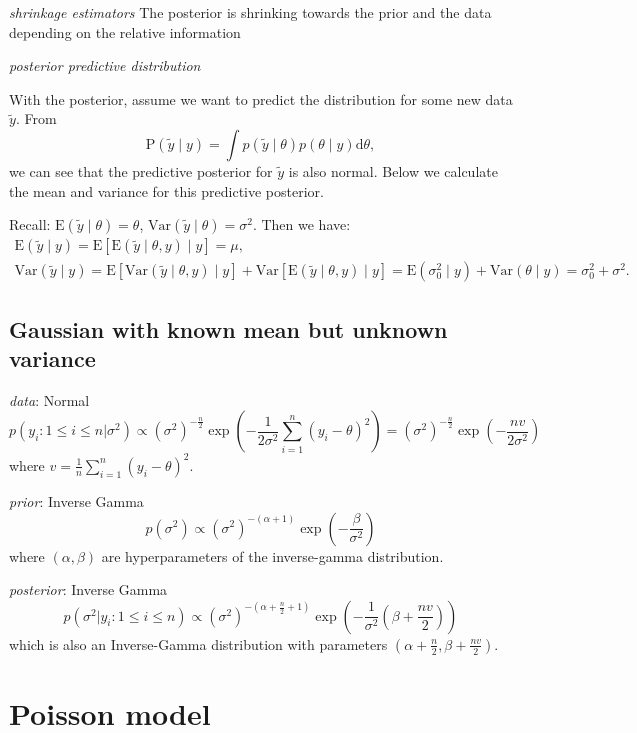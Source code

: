 \documentclass[twoside]{article}
\begin{document}
\textit{shrinkage estimators}
The posterior is shrinking towards the prior and the data depending on the relative information

\textit{posterior predictive distribution} 

With the posterior, assume we want to predict the distribution for some new data $\tilde{y}$. From
\[
\text{P}(\tilde{y}\mid y) = \int p(\tilde{y}\mid \theta) p(\theta\mid y)\mathrm{d}\theta,
\]
we can see that the predictive posterior for $\tilde{y}$ is also normal. Below we calculate the mean and variance for this predictive posterior.

Recall: $\mathrm{E}(\tilde{y}\mid \theta) = \theta$, $\mathrm{Var}(\tilde{y}\mid \theta) = \sigma^2$. Then we have:
\begin{gather*}
\mathrm{E}(\tilde{y}\mid y) = \mathrm{E}\left[\mathrm{E}(\tilde{y}\mid \theta,y)\mid y\right] = \mu,\\
\mathrm{Var}(\tilde{y}\mid y) = \mathrm{E}[\mathrm{Var}(\tilde{y}\mid \theta,y)\mid y] + \mathrm{Var}[\mathrm{E}(\tilde{y}\mid \theta,y)\mid y] = \mathrm{E}(\sigma_0^2 \mid y) + \mathrm{Var}(\theta\mid y ) = \sigma_0^2 + \sigma^2.
\end{gather*}

\subsection{Gaussian with known mean but unknown variance}

\textit{data}: Normal \\ 
$$
p(y_i:1\leq i\leq n|\sigma^{2})\propto (\sigma^{2})^{-\frac{n}{2}}\exp{(-\frac{1}{2\sigma^{2}}\sum_{i=1}^{n}(y_i-\theta)^{2})}=(\sigma^{2})^{-\frac{n}{2}}\exp{(-\frac{nv}{2\sigma^{2}})}
$$ 
where $v=\frac{1}{n}\sum_{i=1}^{n}(y_i-\theta)^{2}$.

\textit{prior}: Inverse Gamma  
$$
p(\sigma^{2})\propto (\sigma^2)^{-(\alpha+1)}\exp{(-\frac{\beta}{\sigma^2})}
$$
where $(\alpha,\beta)$ are hyperparameters of the inverse-gamma distribution.

\textit{posterior}: Inverse Gamma  
$$
p(\sigma^{2}|y_i:1\leq i\leq n)\propto (\sigma^2)^{-(\alpha+\frac{n}{2}+1)}\exp{(-\frac{1}{\sigma^2}(\beta+\frac{nv}{2}))}
$$
which is also an Inverse-Gamma distribution with parameters $(\alpha+\frac{n}{2},\beta+\frac{nv}{2})$.
\section{Poisson model}
\end{document}
